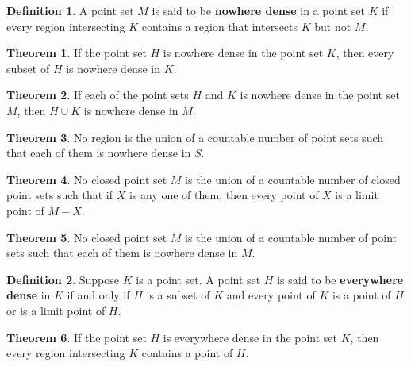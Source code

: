 \documentclass{article}
\theoremstyle{definition}
\newtheorem{definition}{Definition}
\newtheorem{theorem}{Theorem}
\theoremstyle{definition}
\theoremstyle{plain}
\begin{document}
\begin{definition}
  A point set $M$ is said to be \textbf{nowhere dense} in a point set $K$ if
  every region intersecting $K$ contains a region that intersects $K$ but not
  $M$.
\end{definition}

\begin{theorem}
  If the point set $H$ is nowhere dense in the point set $K$, then every subset
  of $H$ is nowhere dense in $K$.
\end{theorem}

\begin{theorem}
  If each of the point sets $H$ and $K$ is nowhere dense in the point set $M$,
  then $H \cup K$ is nowhere dense in $M$.
\end{theorem}

\begin{theorem}
  No region is the union of a countable number of point sets such that each of
  them is nowhere dense in $S$.
\end{theorem}

\begin{theorem}
  No closed point set $M$ is the union of a countable number of closed point
  sets such that if $X$ is any one of them, then every point of $X$ is a limit
  point of $M - X$.
\end{theorem}

\begin{theorem}
  No closed point set $M$ is the union of a countable number of point sets such
  that each of them is nowhere dense in $M$.
\end{theorem}

\begin{definition}
  Suppose $K$ is a point set.  A point set $H$ is said to be \textbf{everywhere
  dense} in $K$ if and only if $H$ is a subset of $K$ and every point of $K$ is
  a point of $H$ or is a limit point of $H$.
\end{definition}

\begin{theorem}
  If the point set $H$ is everywhere dense in the point set $K$, then every
  region intersecting $K$ contains a point of $H$.
\end{theorem}
\end{document}
